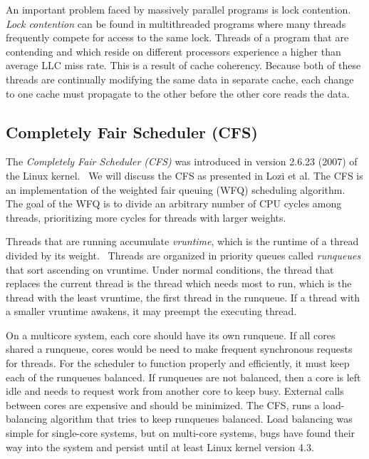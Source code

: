 \documentclass{sig-alternate}
\begin{document}
An important problem faced by massively parallel programs is lock contention. \emph{Lock contention} can be found in multithreaded programs where many threads frequently compete for access to the same lock. Threads of a program that are contending and which reside on different processors experience a higher than average LLC miss rate. This is a result of cache coherency. Because both of these threads are continually modifying the same data in separate cache, each change to one cache must propagate to the other before the other core reads the data.


\subsection{Completely Fair Scheduler (CFS)}
\label{sec:cfs}

The \emph{Completely Fair Scheduler (CFS)} was introduced in version 2.6.23 (2007) of the Linux kernel.~\cite{Jo:2017} We will discuss the CFS as presented in Lozi et al. The CFS is an implementation of the weighted fair queuing (WFQ) scheduling algorithm. The goal of the WFQ is to divide an arbitrary number of CPU cycles among threads, prioritizing more cycles for threads with larger weights.~\cite{Lozi:2016}

Threads that are running accumulate \emph{vruntime}, which is the runtime of a thread divided by its weight.~\cite{SchedThesis} Threads are organized in priority queues called \emph{runqueues} that sort ascending on vruntime. Under normal conditions, the thread that replaces the current thread is the thread which needs most to run, which is the thread with the least vruntime, the first thread in the runqueue. If a thread with a smaller vruntime awakens, it may preempt the executing thread.~\cite{Lozi:2016}

On a multicore system, each core should have its own runqueue. If all cores shared a runqueue, cores would be need to make frequent synchronous requests for threads. For the scheduler to function properly and efficiently, it must keep each of the runqueues balanced. If runqueues are not balanced, then a core is left idle and needs to request work from another core to keep busy. External calls between cores are expensive and should be minimized. The CFS, runs a load-balancing algorithm that tries to keep runqueues balanced. Load balancing was simple for single-core systems, but on multi-core systems, bugs have found their way into the system and persist until at least Linux kernel version 4.3.~\cite{Lozi:2016}
\end{document}
